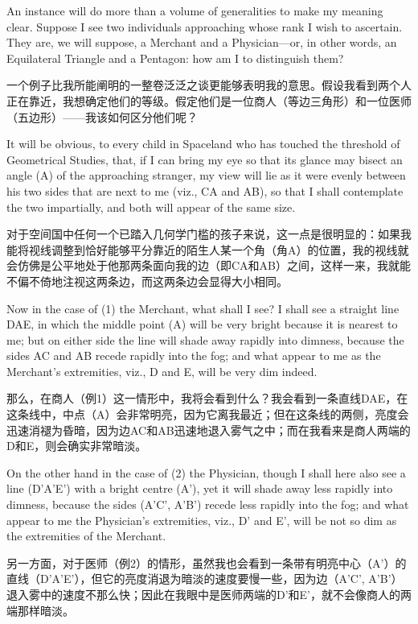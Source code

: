 \documentclass[12pt,UTF8]{ctexbook}
\begin{document}
An instance will do more than a volume of generalities to make my meaning clear. Suppose I see two individuals approaching whose rank I wish to ascertain. They are, we will suppose, a Merchant and a Physician---or, in other words, an Equilateral Triangle and a Pentagon: how am I to distinguish them?

一个例子比我所能阐明的一整卷泛泛之谈更能够表明我的意思。假设我看到两个人正在靠近，我想确定他们的等级。假定他们是一位商人（等边三角形）和一位医师（五边形）——我该如何区分他们呢？

It will be obvious, to every child in Spaceland who has touched the threshold of Geometrical Studies, that, if I can bring my eye so that its glance may bisect an angle (A) of the approaching stranger, my view will lie as it were evenly between his two sides that are next to me (viz., CA and AB), so that I shall contemplate the two impartially, and both will appear of the same size.

对于空间国中任何一个已踏入几何学门槛的孩子来说，这一点是很明显的：如果我能将视线调整到恰好能够平分靠近的陌生人某一个角（角A）的位置，我的视线就会仿佛是公平地处于他那两条面向我的边（即CA和AB）之间，这样一来，我就能不偏不倚地注视这两条边，而这两条边会显得大小相同。

Now in the case of (1) the Merchant, what shall I see? I shall see a straight line DAE, in which the middle point (A) will be very bright because it is nearest to me; but on either side the line will shade away rapidly into dimness, because the sides AC and AB recede rapidly into the fog; and what appear to me as the Merchant's extremities, viz., D and E, will be very dim indeed.

那么，在商人（例1）这一情形中，我将会看到什么？我会看到一条直线DAE，在这条线中，中点（A）会非常明亮，因为它离我最近；但在这条线的两侧，亮度会迅速消褪为昏暗，因为边AC和AB迅速地退入雾气之中；而在我看来是商人两端的D和E，则会确实非常暗淡。

On the other hand in the case of (2) the Physician, though I shall here also see a line (D'A'E') with a bright centre (A'), yet it will shade away less rapidly into dimness, because the sides (A'C', A'B') recede less rapidly into the fog; and what appear to me the Physician's extremities, viz., D' and E', will be not so dim as the extremities of the Merchant.

另一方面，对于医师（例2）的情形，虽然我也会看到一条带有明亮中心（A'）的直线（D'A'E'），但它的亮度消退为暗淡的速度要慢一些，因为边（A'C', A'B'）退入雾中的速度不那么快；因此在我眼中是医师两端的D'和E'，就不会像商人的两端那样暗淡。
\end{document}
